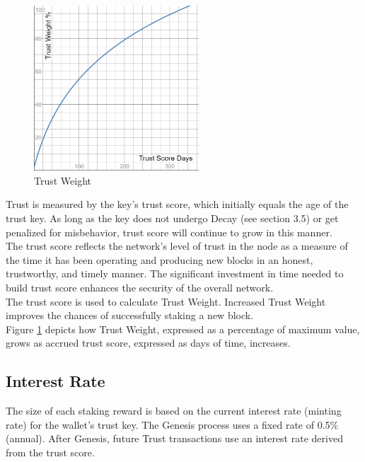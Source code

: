 \documentclass[11pt]{article}
\begin{document}
\begin{figure}
    \centering
    \includegraphics[width=0.55\textwidth]{images/trustWeight.png}
    \caption{Trust Weight \label{fig:trustWeight}}
\end{figure}

\noindent Trust is measured by the key’s trust score, which initially equals the age of the trust key. As long as the key does not undergo Decay (see section 3.5) or get penalized for misbehavior, trust score will continue to grow in this manner.\\

\noindent The trust score reflects the network’s level of trust in the node as a measure of the time it has been operating and producing new blocks in an honest, trustworthy, and timely manner. The significant investment in time needed to build trust score enhances the security of the overall network.\\

\noindent The trust score is used to calculate Trust Weight. Increased Trust Weight improves the chances of successfully staking a new block.\\

\noindent Figure \ref{fig:trustWeight} depicts how Trust Weight, expressed as a percentage of maximum value, grows as accrued trust score, expressed as days of time, increases.\\

\subsection{Interest Rate}
The size of each staking reward is based on the current interest rate (minting rate) for the wallet’s trust key. The Genesis process uses a fixed rate of 0.5\% (annual). After Genesis, future Trust transactions use an interest rate derived from the trust score.\\
\end{document}
